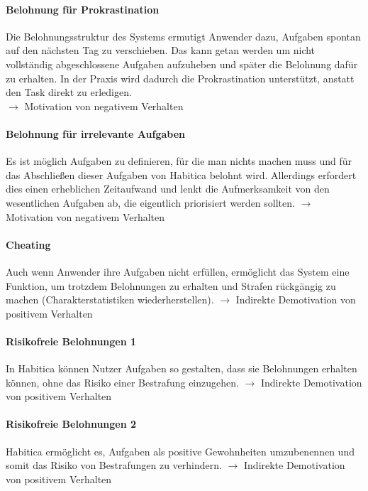 \documentclass[sigconf, nonacm]{acmart}
\begin{document}
\paragraph{Belohnung für Prokrastination}\label{sec:cpe3}
Die Belohnungsstruktur des Systems ermutigt Anwender dazu, Aufgaben spontan auf den nächsten Tag zu verschieben. Das kann getan werden um nicht vollständig abgeschlossene Aufgaben aufzuheben und später die Belohnung dafür zu erhalten. In der Praxis wird dadurch die Prokrastination unterstützt, anstatt den Task direkt zu erledigen.\\
$\rightarrow$ Motivation von negativem Verhalten

\paragraph{Belohnung für irrelevante Aufgaben}\label{sec:cpe4}
Es ist möglich Aufgaben zu definieren, für die man nichts machen muss und für das Abschließen dieser Aufgaben von Habitica belohnt wird. Allerdings erfordert dies einen erheblichen Zeitaufwand und lenkt die Aufmerksamkeit von den wesentlichen Aufgaben ab, die eigentlich priorisiert werden sollten.
$\rightarrow$ Motivation von negativem Verhalten

\paragraph{Cheating}\label{sec:cpe5}
Auch wenn Anwender ihre Aufgaben nicht erfüllen, ermöglicht das System eine Funktion, um trotzdem Belohnungen zu erhalten und Strafen rückgängig zu machen (Charakterstatistiken wiederherstellen).
$\rightarrow$ Indirekte Demotivation von positivem Verhalten

\paragraph{Risikofreie Belohnungen 1}\label{sec:cpe6}
In Habitica können Nutzer Aufgaben so gestalten, dass sie Belohnungen erhalten können, ohne das Risiko einer Bestrafung einzugehen.
$\rightarrow$ Indirekte Demotivation von positivem Verhalten

\paragraph{Risikofreie Belohnungen 2}\label{sec:cpe7}
Habitica ermöglicht es, Aufgaben als positive Gewohnheiten umzubenennen und somit das Risiko von Bestrafungen zu verhindern.
$\rightarrow$ Indirekte Demotivation von positivem Verhalten 
\\
\\
\end{document}
